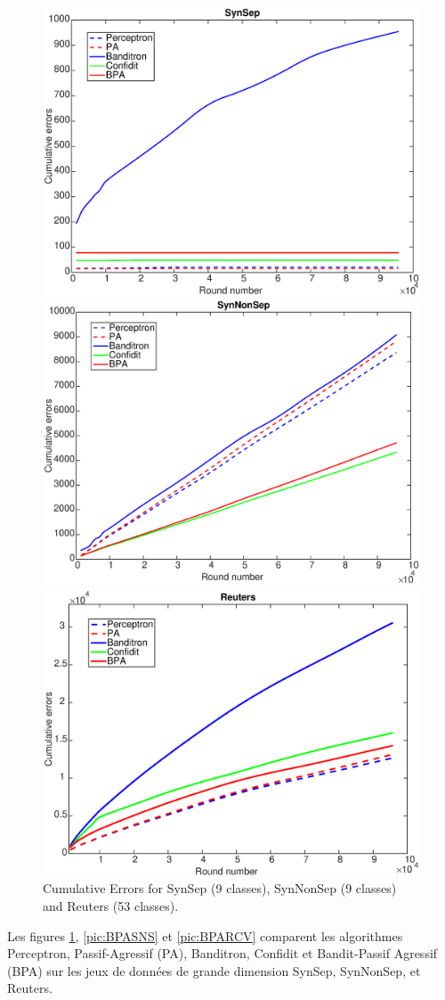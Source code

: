 \documentclass[preprint,12pt,authoryear]{elsarticle}
\begin{document}
\begin{figure}[ht!]
	
	\centerline{
		\includegraphics[width=.6\linewidth]{figs/SynSep.eps}
	}
	
	\centerline{
		\includegraphics[width=.6\linewidth]{figs/SynNonSep.eps}
	}
	\centerline{
		\includegraphics[width=.6\linewidth]{figs/RCV1_v2_53class.eps}}
	\caption{Cumulative Errors for SynSep (9 classes), SynNonSep (9 classes) and Reuters (53 classes).}
	\label{pic:BPASS}
\end{figure}

Les figures \ref{pic:BPASS}, \ref{pic:BPASNS} et \ref{pic:BPARCV} comparent les algorithmes Perceptron, Passif-Agressif (PA), Banditron, Confidit et Bandit-Passif Agressif (BPA) sur les jeux de données de grande dimension SynSep, SynNonSep, et Reuters. 
\end{document}
